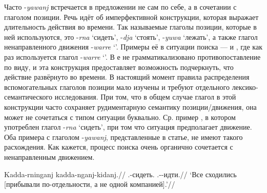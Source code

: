 Часто -\textit{yawanj} встречается в предложении не сам по себе, а в сочетании с глаголом позиции. Речь идёт об имперфективной конструкции, которая выражает длительность действия во времени. Так называемые глаголы позиции, которые в ней используются, это -\textit{rna} `сидеть', -\textit{dja} `стоять', -\textit{yuwa} `лежать', а также глагол ненаправленного движения -\textit{warre} `\warre'. Примеры её в ситуации поиска ---  и , где как раз используется глагол -\textit{warre} `\warre'. В  е не грамматикализовано противопоставление по виду, и эта конструкция предоставляет возможность подчеркнуть, что действие развёрнуто во времени. В настоящий момент правила распределения вспомогательных глаголов позиции мало изучены и требуют отдельного лексико-семантического исследования. При том, что в общем случае глагол в этой конструкции часто сохраняет рудиментарную семантику позиции/движения, она может не сочетаться с типом ситуации буквально. Ср. пример , в котором употреблен глагол -\textit{rna} `сидеть', при том что ситуация предполагает движение. Оба примера с глаголом -\textit{yawanj}, представленные в статье, не имеют такого расхождения. Как кажется, процесс поиска очень органично сочетается с ненаправленным движением. 

\begingl
\gla Kadda-rninganj kadda-nganj-kidanj.//
\glb \Tpl.\Real-сидеть.\Pst{} \Tpl.\Real-\Hith-идти.\Pst{}//
\glft `Все сходились [прибывали по-отдельности, а не одной компанией].'//%
\endgl\xe

